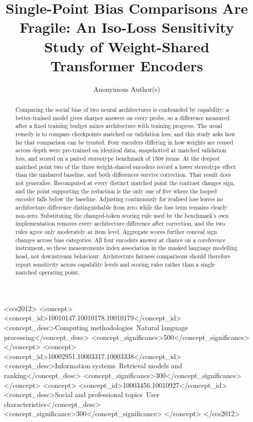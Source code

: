 \documentclass[sigconf,natbib=true,anonymous=true]{acmart}
\begin{document}
\title{Single-Point Bias Comparisons Are Fragile: An Iso-Loss Sensitivity Study
       of Weight-Shared Transformer Encoders}

\author{Anonymous Author(s)}

\begin{abstract}
Comparing the social bias of two neural architectures is confounded by
capability: a better-trained model gives sharper answers on every probe, so a
difference measured after a fixed training budget mixes architecture with
training progress. The usual remedy is to compare checkpoints matched on
validation loss, and this study asks how far that comparison can be trusted.
Four encoders differing in how weights are reused across depth were
pre-trained on identical data, snapshotted at matched validation loss, and scored
on a paired stereotype benchmark of 1508 items. At the deepest matched point two
of the three weight-shared encoders record a lower stereotype effect than the
unshared baseline, and both differences survive correction. That result does not
generalise. Recomputed at every distinct matched point the contrast changes sign,
and the point supporting the reduction is the only one of five where the looped
encoder falls below the baseline. Adjusting continuously for realised loss leaves
no architecture difference distinguishable from zero while the loss term remains
clearly non-zero. Substituting the changed-token scoring rule used by the
benchmark's own implementation removes every architecture difference after
correction, and the two rules agree only moderately at item level. Aggregate
scores further conceal sign changes across bias categories. All four encoders
answer at chance on a coreference instrument, so these measurements index
association in the masked language modelling head, not downstream behaviour. Architecture fairness comparisons should therefore report sensitivity
across capability levels and scoring rules rather than a single matched
operating point.
\end{abstract}

\begin{CCSXML}
<ccs2012>
<concept>
<concept_id>10010147.10010178.10010179</concept_id>
<concept_desc>Computing methodologies~Natural language processing</concept_desc>
<concept_significance>500</concept_significance>
</concept>
<concept>
<concept_id>10002951.10003317.10003338</concept_id>
<concept_desc>Information systems~Retrieval models and ranking</concept_desc>
<concept_significance>300</concept_significance>
</concept>
<concept>
<concept_id>10003456.10010927</concept_id>
<concept_desc>Social and professional topics~User characteristics</concept_desc>
<concept_significance>300</concept_significance>
</concept>
</ccs2012>
\end{CCSXML}
\end{document}

